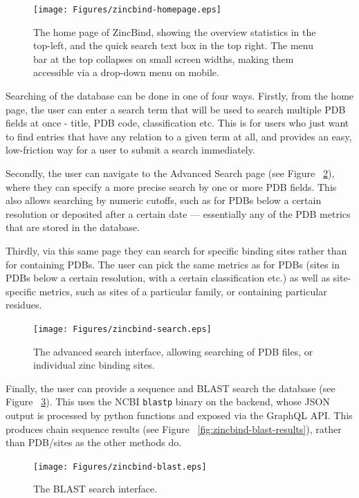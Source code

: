 \begin{figure}
\centering
\texttt{[image: Figures/zincbind-homepage.eps]}
\caption{\label{fig:zincbind-homepage} The home page of ZincBind, showing the
overview statistics in the top-left, and the quick search text box in the top right.
The menu bar at the top collapses on small screen widths, making them accessible via a
drop-down menu on mobile.}
\end{figure}

Searching of the database can be done in one of four ways. Firstly, from the home page, the user can enter a search term that will be used to search multiple PDB fields at once - title, PDB code, classification etc. This is for users who just want to find entries that have any relation to a given term at all, and provides an easy, low-friction way for a user to submit a search immediately.

Secondly, the user can navigate to the Advanced Search page (see Figure ~\ref{fig:zincbind-search}), where they can specify a more precise search by one or more PDB fields. This also allows searching by numeric cutoffs, such as for PDBs below a certain resolution or deposited after a certain date --- essentially any of the PDB metrics that are stored in the database.

Thirdly, via this same page they can search for specific binding sites rather than for containing PDBs. The user can pick the same metrics as for PDBs (sites in PDBs below a certain resolution, with a certain classification etc.) as well as site-specific metrics, such as sites of a particular family, or containing particular residues.

\begin{figure}
\centering
\texttt{[image: Figures/zincbind-search.eps]}
\caption{\label{fig:zincbind-search} The advanced search interface, allowing searching of
PDB files, or individual zinc binding sites.}
\end{figure}

Finally, the user can provide a sequence and BLAST search the database (see Figure ~\ref{fig:zincbind-blast}). This uses the NCBI \texttt{blastp} binary on the backend, whose JSON output is processed by python functions and exposed via the GraphQL API. This produces chain sequence results (see Figure ~\ref{fig:zincbind-blast-results}), rather than PDB/sites as the other methods do.

\begin{figure}
\centering
\texttt{[image: Figures/zincbind-blast.eps]}
\caption{\label{fig:zincbind-blast} The BLAST search interface.}
\end{figure}

